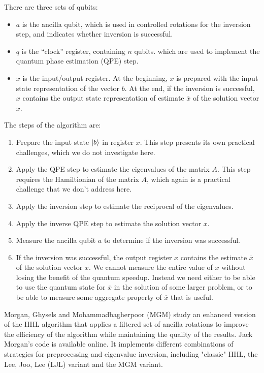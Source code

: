\documentclass[12pt]{extarticle}
\begin{document}
There are three sets of qubits:
\begin{itemize}
    \item $a$ is the ancilla qubit, which is used in controlled rotations for the inversion step, and indicates whether inversion is successful.
    \item $q$ is the ``clock'' register, containing $n$ qubits. which are used to implement the quantum phase estimation (QPE) step.
    \item $x$ is the input/output register. At the beginning, $x$ is prepared with the input state representation of the vector $b$. At the end, if the inversion is successful, $x$ contains the output state representation of estimate $\overline{x}$ of the solution vector $x$.
\end{itemize}

The steps of the algorithm are:
\begin{enumerate}
    \item Prepare the input state $\ket{b}$ in register $x$. This step presents its own practical challenges, which we do not investigate here.
    \item Apply the QPE step to estimate the eigenvalues of the matrix $A$. This step requires the Hamiltionian of the matrix $A$, which again is a practical challenge that we don't address here.
    \item Apply the inversion step to estimate the reciprocal of the eigenvalues.
    \item Apply the inverse QPE step to estimate the solution vector $x$.
    \item Measure the ancilla qubit $a$ to determine if the inversion was successful.
    \item If the inversion was successful, the output register $x$ contains the estimate $\overline{x}$ of the solution vector $x$. We cannot measure the entire value of $\overline{x}$ without losing the benefit of the quantum speedup. Instead we need either to be able to use the quantum state for $\overline{x}$ in the solution of some larger problem, or to be able to measure some aggregate property of $\overline{x}$ that is useful.
\end{enumerate}

Morgan, Ghysels and Mohammadbagherpoor (MGM)\cite{ssrn_enhanced_hhl} study an enhanced version of the HHL algorithm that applies a filtered set of ancilla rotations to improve the efficiency of the algorithm while maintaining the quality of the results.
Jack Morgan's code is available online\cite{github_enhanced_hhl}.
It implements different combinations of strategies for preprocessing and eigenvalue inversion, including "classic" HHL,
the Lee, Joo, Lee (LJL) variant\cite{lee2019hybrid} and the MGM variant.
\end{document}
